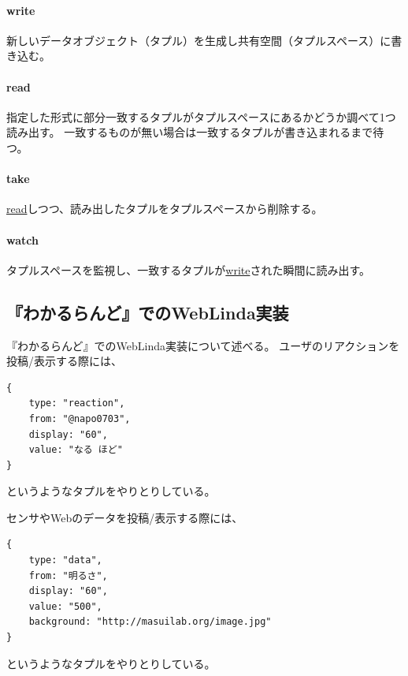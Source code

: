 \paragraph*{write}
新しいデータオブジェクト（タプル）を生成し共有空間（タプルスペース）に書き込む。

\vspace{4mm}
\paragraph*{read}
指定した形式に部分一致するタプルがタプルスペースにあるかどうか調べて1つ読み出す。
一致するものが無い場合は一致するタプルが書き込まれるまで待つ。

\vspace{2mm}
\paragraph*{take}
\url{read}しつつ、読み出したタプルをタプルスペースから削除する。

\vspace{2mm}
\paragraph*{watch}
タプルスペースを監視し、一致するタプルが\url{write}された瞬間に読み出す。

\subsection{『わかるらんど』でのWebLinda実装}
『わかるらんど』でのWebLinda実装について述べる。
ユーザのリアクションを投稿/表示する際には、
\vspace{2mm}
\begin{verbatim}
{
    type: "reaction",
    from: "@napo0703",
    display: "60",
    value: "なる ほど"
}
\end{verbatim}
\vspace{2mm}
というようなタプルをやりとりしている。

センサやWebのデータを投稿/表示する際には、
\vspace{2mm}
\begin{verbatim}
{
    type: "data",
    from: "明るさ",
    display: "60",
    value: "500",
    background: "http://masuilab.org/image.jpg"
}
\end{verbatim}
\vspace{2mm}
というようなタプルをやりとりしている。

\vspace{4mm}
